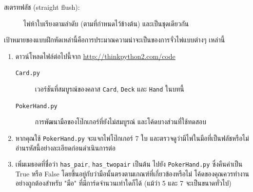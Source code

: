 \begin{exercise}
\begin{description}
\item[สเตรทฟลัช (straight flush):] ไพ่ห้าใบเรียงตามลำดับ (ตามที่กำหนดไว้ข้างต้น) และเป็นชุดเดียวกัน
\vspace{-0.05in}

\end{description}
%
เป้าหมายของแบบฝึกหัดเหล่านี้คือการประมาณความน่าจะเป็นของการจั่วไพ่แบบต่างๆ เหล่านี้
\begin{enumerate}

\item  ดาวน์โหลดไฟล์ต่อไปนี้จาก \url{http://thinkpython2.com/code}
\begin{description}

\item[{\tt Card.py}] เวอร์ชันที่สมบูรณ์ของคลาส {\tt Card}, {\tt Deck} และ {\tt Hand} ในบทนี้

\item[{\tt PokerHand.py}] การพัฒนามือของโป๊กเกอร์ที่ยังไม่สมบูรณ์ และโค้ดบางส่วนที่ใช้ทดสอบ

\end{description}
%
\item  หากคุณใช้ {\tt PokerHand.py} จะแจกไพ่โป๊กเกอร์ 7 ใบ และตรวจดูว่ามีไพ่ในมือที่เป็นฟลัชหรือไม่ อ่านรหัสนี้อย่างละเอียดก่อนดำเนินการต่อ

\item  เพิ่มเมธอดที่ชื่อว่า \verb"has_pair", \verb"has_twopair" เป็นต้น ไปยัง {\tt PokerHand.py} 
ซึ่งคืนค่าเป็น True หรือ False โดยขึ้นอยู่กับว่ามือนั้นตรงตามเกณฑ์ที่เกี่ยวข้องหรือไม่ โค้ดของคุณควรทำงานอย่างถูกต้องสำหรับ "มือ" ที่มีการ์ดจำนวนเท่าใดก็ได้ (แม้ว่า 5 และ 7 จะเป็นขนาดทั่วไป)



\end{enumerate}
\end{exercise}
